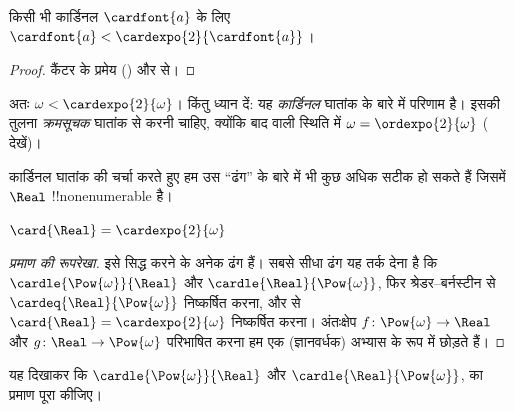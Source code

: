 \documentclass[../../../include/open-logic-section]{subfiles}
\begin{document}
\begin{cor}
किसी भी कार्डिनल $\cardfont{a}$ के लिए
$\cardfont{a}<\cardexpo{2}{\cardfont{a}}$।
\end{cor}

\begin{proof}
कैंटर के प्रमेय () और
 से।
\end{proof}
\noindent
अतः $\omega<\cardexpo{2}{\omega}$। किंतु ध्यान दें: यह \emph{कार्डिनल}
घातांक के बारे में परिणाम है। इसकी तुलना \emph{क्रमसूचक} घातांक से करनी
चाहिए, क्योंकि बाद वाली स्थिति में $\omega=\ordexpo{2}{\omega}$
( देखें)।

कार्डिनल घातांक की चर्चा करते हुए हम उस ``ढंग'' के बारे में भी कुछ अधिक
सटीक हो सकते हैं जिसमें $\Real$ !!{nonenumerable} है।

\begin{thm}
$\card{\Real} = \cardexpo{2}{\omega}$
\end{thm}

\begin{proof}[प्रमाण की रूपरेखा]
इसे सिद्ध करने के अनेक ढंग हैं। सबसे सीधा ढंग यह तर्क देना है कि
$\cardle{\Pow{\omega}}{\Real}$ और $\cardle{\Real}{\Pow{\omega}}$, फिर
श्रेडर--बर्नस्टीन से $\cardeq{\Real}{\Pow{\omega}}$ निष्कर्षित करना, और
 से
$\card{\Real}=\cardexpo{2}{\omega}$ निष्कर्षित करना। अंतःक्षेप
$f\colon\Pow{\omega}\to\Real$ और
$g\colon\Real\to\Pow{\omega}$ परिभाषित करना हम एक (ज्ञानवर्धक) अभ्यास के
रूप में छोड़ते हैं।
\end{proof}

\begin{prob}
यह दिखाकर कि $\cardle{\Pow{\omega}}{\Real}$ और
$\cardle{\Real}{\Pow{\omega}}$, 
 का प्रमाण पूरा
कीजिए।
\end{prob}
\end{document}
